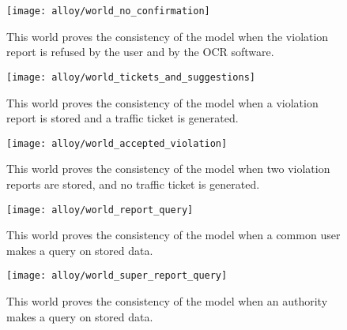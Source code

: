 \documentclass[./main.tex]{subfiles}
\begin{document}


\newpage



\begin{figure}[H]
\centering
\texttt{[image: alloy/world\_no\_confirmation]}
\caption{This world proves the consistency of the model when the violation
report is refused by the user and by the OCR software.}
\end{figure}

\newpage



\begin{figure}[H]
\centering
\texttt{[image: alloy/world\_tickets\_and\_suggestions]}
\caption{This world proves the consistency of the model when a violation
report is stored and a traffic ticket is generated.}
\end{figure}

\newpage



\begin{figure}[H]
\centering
\texttt{[image: alloy/world\_accepted\_violation]}
\caption{This world proves the consistency of the model when two violation
reports are stored, and no traffic ticket is generated.}
\end{figure}

\newpage



\begin{figure}[H]
\centering
\texttt{[image: alloy/world\_report\_query]}
\caption{This world proves the consistency of the model when a common user
makes a query on stored data.}
\end{figure}

\newpage



\begin{figure}[H]
\centering
\texttt{[image: alloy/world\_super\_report\_query]}
\caption{This world proves the consistency of the model when an authority
makes a query on stored data.}
\end{figure}
\end{document}
